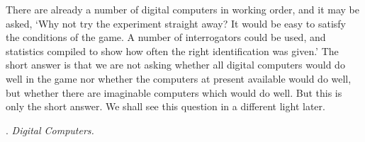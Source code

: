 \documentclass[10pt]{article} %
\begin{document}
There are already a number of digital computers in working order, and it may be asked, `Why not try the experiment straight away? It would be easy to satisfy the conditions of the game. A number of interrogators could be used, and statistics compiled to show how often the right identification was given.' The short answer is that we are not asking whether all digital computers would do well in the game nor whether the computers at present available would do well, but whether there are imaginable computers which would do well. But this is only the short answer. We shall see this question in a different light later.

\vspace{0.5\baselineskip} %
\noindent{}. \textit{Digital Computers.}
\vspace{0.5\baselineskip} %
\end{document}
